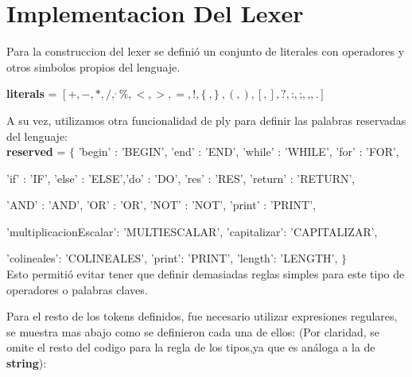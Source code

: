 \section{Implementacion Del Lexer}

Para la construccion del lexer se definió un conjunto de literales con operadores y otros simbolos propios del lenguaje.

\textbf{literals} = $[+,- , * , / , ^ ,\% , < , > , = , ! , \{\ , \}\ , ( , ) , [ , ] , ? , \textbf{:} , \textbf{;} , \textbf{,} , \textbf{.} ]$

A su vez, utilizamos otra funcionalidad de ply para definir las palabras reservadas del lenguaje: \\

\textbf{reserved} = $\{$
'begin' : 'BEGIN', 'end' : 'END', 'while' : 'WHILE', 'for' : 'FOR',

'if' : 'IF', 'else' : 'ELSE','do' : 'DO', 'res' : 'RES', 'return' : 'RETURN',

'AND' : 'AND', 'OR' : 'OR', 'NOT' : 'NOT', 'print' : 'PRINT',

'multiplicacionEscalar': 'MULTIESCALAR', 'capitalizar': 'CAPITALIZAR', 

'colineales': 'COLINEALES', 'print': 'PRINT', 'length': 'LENGTH',
$\}$ \\

Esto permitió evitar tener que definir demasiadas reglas simples para este tipo de operadores o palabras claves.

Para el resto de los tokens definidos, fue necesario utilizar expresiones regulares, se muestra mas abajo como se definieron cada una de ellos: (Por claridad, se omite el resto del codigo para la regla de los tipos,ya que  es análoga a la de \textbf{string}):


